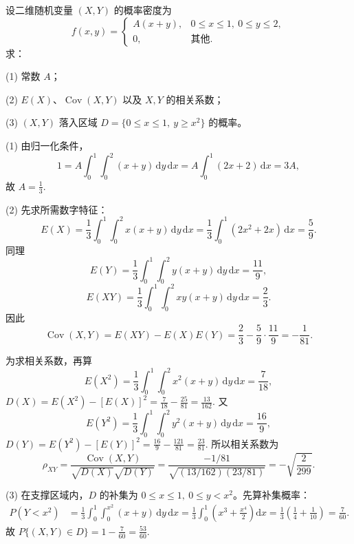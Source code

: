 \documentclass[lang=cn,11pt]{elegantbook}
\begin{document}
\begin{exercise}\label{exer:src-2010-0630-a-04}
设二维随机变量 \((X,Y)\) 的概率密度为
\[
f(x,y)=
\begin{cases}
A(x+y), & 0\le x\le1,\ 0\le y\le2,\\
0, & \text{其他}.
\end{cases}
\]
求：\par
(1) 常数 \(A\)；\par
(2) \(E(X)\)、\(\operatorname{Cov}(X,Y)\) 以及 \(X,Y\) 的相关系数；\par
(3) \((X,Y)\) 落入区域
\(
D=\{0\le x\le1,\ y\ge x^2\}
\)
的概率。
\end{exercise}
\begin{solution}
(1) 由归一化条件，
\[
1=A\int_0^1\int_0^2(x+y)\,\mathrm dy\,\mathrm dx
=A\int_0^1(2x+2)\,\mathrm dx=3A,
\]
故
\(
A=\frac13.
\)

(2) 先求所需数字特征：
\[
E(X)=\frac13\int_0^1\int_0^2 x(x+y)\,\mathrm dy\,\mathrm dx
=\frac13\int_0^1(2x^2+2x)\,\mathrm dx
=\frac59.
\]
同理
\[
E(Y)=\frac13\int_0^1\int_0^2 y(x+y)\,\mathrm dy\,\mathrm dx
=\frac{11}{9},
\]
\[
E(XY)=\frac13\int_0^1\int_0^2 xy(x+y)\,\mathrm dy\,\mathrm dx
=\frac23.
\]
因此
\[
\operatorname{Cov}(X,Y)=E(XY)-E(X)E(Y)
=\frac23-\frac59\cdot\frac{11}{9}
=-\frac1{81}.
\]

为求相关系数，再算
\[
E(X^2)=\frac13\int_0^1\int_0^2 x^2(x+y)\,\mathrm dy\,\mathrm dx
=\frac7{18},
\]
\(
D(X)=E(X^2)-[E(X)]^2=\frac7{18}-\frac{25}{81}=\frac{13}{162}.
\)
又
\[
E(Y^2)=\frac13\int_0^1\int_0^2 y^2(x+y)\,\mathrm dy\,\mathrm dx
=\frac{16}{9},
\]
\(
D(Y)=E(Y^2)-[E(Y)]^2=\frac{16}{9}-\frac{121}{81}=\frac{23}{81}.
\)
所以相关系数为
\[
\rho_{XY}
=\frac{\operatorname{Cov}(X,Y)}{\sqrt{D(X)}\sqrt{D(Y)}}
=\frac{-1/81}{\sqrt{(13/162)(23/81)}}
=-\sqrt{\frac{2}{299}}.
\]

(3) 在支撑区域内，\(D\) 的补集为 \(0\le x\le1,\ 0\le y<x^2\)。先算补集概率：
\[
\begin{aligned}
P(Y<x^2)
&=\frac13\int_0^1\int_0^{x^2}(x+y)\,\mathrm dy\,\mathrm dx=\frac13\int_0^1\left(x^3+\frac{x^4}{2}\right)\mathrm dx
=\frac13\left(\frac14+\frac1{10}\right)
=\frac7{60}.
\end{aligned}
\]
故
\(
P\{(X,Y)\in D\}=1-\frac7{60}=\frac{53}{60}.
\)
\end{solution}
\end{document}
